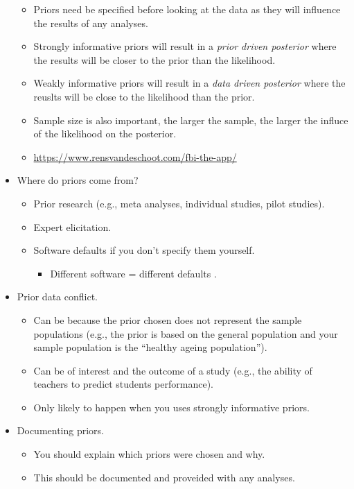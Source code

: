 \documentclass[]{book}
\providecommand{\tightlist}{%
  \setlength{\itemsep}{0pt}\setlength{\parskip}{0pt}}
\begin{document}
\begin{itemize}
  \begin{itemize}
  \tightlist
  \item
    Priors need be specified before looking at the data as they will influence the results of any analyses.
  \item
    Strongly informative priors will result in a \emph{prior driven posterior} where the results will be closer to the prior than the likelihood.
  \item
    Weakly informative priors will result in a \emph{data driven posterior} where the reuslts will be close to the likelihood than the prior.
  \item
    Sample size is also important, the larger the sample, the larger the influce of the likelihood on the posterior.
  \item
    \url{https://www.rensvandeschoot.com/fbi-the-app/}
  \end{itemize}
\item
  Where do priors come from?

  \begin{itemize}
  \tightlist
  \item
    Prior research (e.g., meta analyses, individual studies, pilot studies).
  \item
    Expert elicitation.
  \item
    Software defaults if you don't specify them yourself.

    \begin{itemize}
    \tightlist
    \item
      Different software = different defaults \citep{vanErp2018}.
    \end{itemize}
  \end{itemize}
\item
  Prior data conflict.

  \begin{itemize}
  \tightlist
  \item
    Can be because the prior chosen does not represent the sample populations (e.g., the prior is based on the general population and your sample population is the ``healthy ageing population'').
  \item
    Can be of interest and the outcome of a study (e.g., the ability of teachers to predict students performance).
  \item
    Only likely to happen when you uses strongly informative priors.
  \end{itemize}
\item
  Documenting priors.

  \begin{itemize}
  \tightlist
  \item
    You should explain which priors were chosen and why.
  \item
    This should be documented and proveided with any analyses.
  \end{itemize}
\end{itemize}
\end{document}
